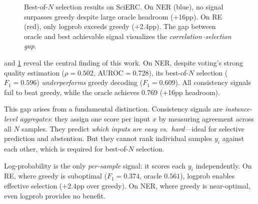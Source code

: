 \documentclass[11pt]{article}
\begin{document}
\begin{figure}[t]
\centering
{}
\caption{Best-of-$N$ selection results on SciERC. On NER (blue), no signal surpasses greedy despite large oracle headroom (+16pp). On RE (red), only logprob exceeds greedy (+2.4pp). The gap between oracle and best achievable signal visualizes the \emph{correlation--selection gap}.}
\label{fig:selection}
\end{figure}

 and \cref{fig:selection} reveal the central finding of this work.
On NER, despite voting's strong quality estimation ($\rho{=}0.502$, AUROC${=}0.728$), its best-of-$N$ selection ($F_1{=}0.596$) \emph{underperforms} greedy decoding ($F_1{=}0.609$).
All consistency signals fail to beat greedy, while the oracle achieves $0.769$ (+16pp headroom).

This gap arises from a fundamental distinction.
Consistency signals are \emph{instance-level aggregates}: they assign one score per input $x$ by measuring agreement across all $N$ samples.
They predict \emph{which inputs are easy vs.\ hard}---ideal for selective prediction and abstention.
But they cannot rank individual samples $y_i$ against each other, which is required for best-of-$N$ selection.

Log-probability is the only \emph{per-sample} signal: it scores each $y_i$ independently.
On RE, where greedy is suboptimal ($F_1{=}0.374$, oracle $0.561$), logprob enables effective selection ($+2.4$pp over greedy).
On NER, where greedy is near-optimal, even logprob provides no benefit.
\end{document}

